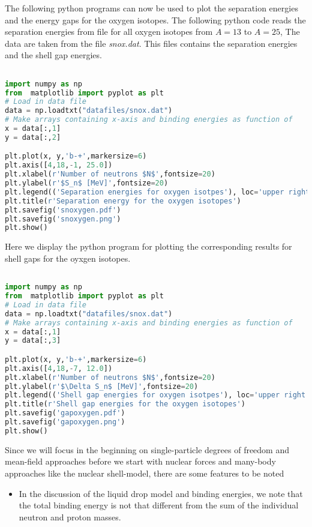 \documentclass[graybox,sectrefs,envcountresetchap,open=right]{svmonodo}
\begin{document}
The following python programs can now be used to plot the separation energies and the energy gaps for the oxygen isotopes.  The following python code reads the separation energies from file for all oxygen isotopes from $A=13$ to $A=25$, The data are taken from the file \emph{snox.dat}.  This files contains the separation energies and the shell gap energies.
\begin{lstlisting}[language=Python,style=blue1bar]

import numpy as np
from  matplotlib import pyplot as plt
# Load in data file
data = np.loadtxt("datafiles/snox.dat")
# Make arrays containing x-axis and binding energies as function of
x = data[:,1]
y = data[:,2]

plt.plot(x, y,'b-+',markersize=6)
plt.axis([4,18,-1, 25.0])
plt.xlabel(r'Number of neutrons $N$',fontsize=20)
plt.ylabel(r'$S_n$ [MeV]',fontsize=20)
plt.legend(('Separation energies for oxygen isotpes'), loc='upper right')
plt.title(r'Separation energy for the oxygen isotopes')
plt.savefig('snoxygen.pdf')
plt.savefig('snoxygen.png')
plt.show()
\end{lstlisting}


Here we display the python program for plotting the corresponding results for shell gaps for the oyxgen isotopes. 
\begin{lstlisting}[language=Python,style=blue1bar]

import numpy as np
from  matplotlib import pyplot as plt
# Load in data file
data = np.loadtxt("datafiles/snox.dat")
# Make arrays containing x-axis and binding energies as function of
x = data[:,1]
y = data[:,3]

plt.plot(x, y,'b-+',markersize=6)
plt.axis([4,18,-7, 12.0])
plt.xlabel(r'Number of neutrons $N$',fontsize=20)
plt.ylabel(r'$\Delta S_n$ [MeV]',fontsize=20)
plt.legend(('Shell gap energies for oxygen isotpes'), loc='upper right')
plt.title(r'Shell gap energies for the oxygen isotopes')
plt.savefig('gapoxygen.pdf')
plt.savefig('gapoxygen.png')
plt.show()
\end{lstlisting}





Since we will focus in the beginning on single-particle degrees of freedom and mean-field approaches before we
start with nuclear forces and many-body approaches like the nuclear shell-model, there are some features to be noted

\begin{itemize}
\item In the discussion of the liquid drop model and binding energies, we note that the total binding energy is not that different from the sum of the individual neutron and proton masses. 
\end{itemize}
\end{document}

